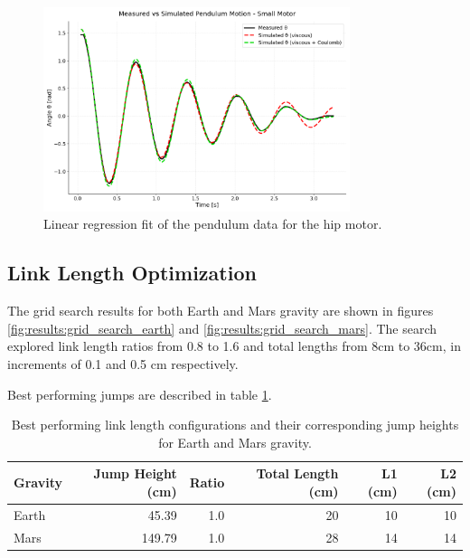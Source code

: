 \begin{figure}[h]
    \centering
    \includegraphics[width=0.8\textwidth]{Images/results/pendulum_small.png}
    \caption{Linear regression fit of the pendulum data for the hip motor.}
    \label{fig:results:motor_friction_estimation:pendulum_small}
\end{figure}




\subsection{Link Length Optimization}
\label{sec:results:link_length_optimization}
The grid search results for both Earth and Mars gravity are shown in figures \ref{fig:results:grid_search_earth} and \ref{fig:results:grid_search_mars}. The search explored link length ratios from 0.8 to 1.6 and total lengths from 8cm to 36cm, in increments of 0.1 and 0.5 cm respectively.

Best performing jumps are described in table \ref{tab:results:grid_search:best_jumps}.
\begin{table}[h]
    \centering
    \begin{tabular}{lrrrrr}
        \hline
        Gravity & Jump Height (cm) & Ratio & Total Length (cm) & L1 (cm) & L2 (cm) \\
        \hline
        Earth & 45.39 & 1.0 & 20 & 10 & 10 \\
        Mars & 149.79 & 1.0 & 28 & 14 & 14 \\
        \hline
    \end{tabular}
    \caption{Best performing link length configurations and their corresponding jump heights for Earth and Mars gravity.}
    \label{tab:results:grid_search:best_jumps}
\end{table}


